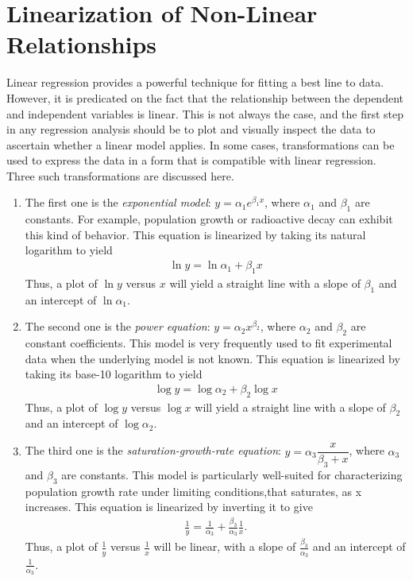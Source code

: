 \documentclass[book.tex]{subfiles}
\begin{document}
\section{Linearization of Non-Linear Relationships}
Linear regression provides a powerful technique for fitting a best line to data. However, it is predicated on the fact that the relationship between the dependent and independent variables is linear. This is not always the case, and the first step in any regression analysis should be to plot and visually inspect the data to ascertain whether a linear model applies. In some cases, transformations can be used to express the data in a form that is compatible with linear regression. Three such transformations are discussed here.
\begin{enumerate}
	\item The first one is the \textit{exponential model}: $y = \alpha_1e^{\beta_1x}$, where $\alpha_1$ and $\beta_1$ are constants. For example, population growth or
	radioactive decay can exhibit this kind of behavior. This equation is linearized by taking its natural logarithm to yield
	\begin{align}
	\ln{y} =	\ln{\alpha_1} + \beta_1x
	\end{align}
	Thus, a plot of $\ln{y}$ versus $x$ will yield a straight line with a slope of $\beta_1$ and an intercept of $\ln{\alpha_1}$.
	\item The second one is the \textit{power equation}:  $y = \alpha_2x^{\beta_2}$, where $\alpha_2$ and $\beta_2$ are constant coefficients. This model is very frequently used to fit experimental data when the underlying model is not known. This equation is linearized by taking its base-10 logarithm to yield
	\begin{align}
	\log{y} = \log{\alpha_2} + \beta_2\log{x}
	\end{align}
	Thus, a plot of $\log{y}$ versus $\log{x}$ will yield a straight line with a slope of $\beta_2$ and an intercept of $\log{\alpha_2}$.
	\item The third one is the \textit{saturation-growth-rate equation}: $y = \alpha_3\dfrac{x}{\beta_3+x}$, where $\alpha_3$ and $\beta_3$ are constants. This model is particularly well-suited for characterizing population growth rate under limiting conditions,that saturates, as x increases. This equation is linearized by inverting it to give 
	\begin{align}
	\frac{1}{y} = 	\frac{1}{\alpha_3} + \frac{\beta_3}{\alpha_3}\frac{1}{x}.
	\end{align}
	Thus, a plot of $\frac{1}{y}$ versus $\frac{1}{x}$ will be linear, with a slope of $\frac{\beta_3}{\alpha_3}$ and an intercept of $\frac{1}{\alpha_3}$.
\end{enumerate}
\end{document}
